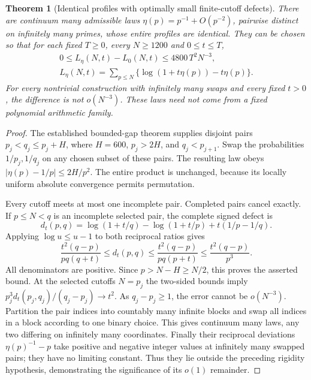 \documentclass[11pt]{article}
\newtheorem{theorem}{Theorem}[section]
\theoremstyle{definition}
\begin{document}
\begin{theorem}[Identical profiles with optimally small finite-cutoff defects]
There are continuum many admissible laws
$\eta(p)=p^{-1}+O(p^{-2})$, pairwise distinct on infinitely many primes,
whose entire profiles are identical. They can be chosen so that for
each fixed $T\ge0$, every $N\ge1200$ and $0\le t\le T$,
\[
 \begin{gathered}
 0\le L_\eta(N,t)-L_0(N,t)\le4800\,T^2N^{-3},\\
 L_\eta(N,t)=\sum_{p\le N}
       \{\log(1+t\eta(p))-t\eta(p)\}.
 \end{gathered}
\]
For every nontrivial construction with infinitely many swaps and every
fixed $t>0$, the difference is not $o(N^{-3})$.
These laws need not come from a fixed polynomial arithmetic family.
\end{theorem}
\begin{proof}
The established bounded-gap theorem supplies disjoint pairs
$p_j<q_j\le p_j+H$, where $H=600$, $p_j>2H$,
and $q_j<p_{j+1}$. Swap the probabilities $1/p_j,1/q_j$
on any chosen subset of these pairs. The resulting law obeys
$|\eta(p)-1/p|\le2H/p^2$.
The entire product is unchanged, because its locally uniform absolute
convergence permits permutation.

Every cutoff meets at most one incomplete pair.
Completed pairs cancel exactly. If $p\le N<q$ is an incomplete
selected pair, the complete signed defect is
\[
 d_t(p,q)=\log(1+t/q)-\log(1+t/p)+t(1/p-1/q).
\]
Applying $\log u\le u-1$ to both reciprocal ratios gives
\[
 \frac{t^2(q-p)}{pq(q+t)}
       \le d_t(p,q)\le
 \frac{t^2(q-p)}{pq(p+t)}
       \le \frac{t^2(q-p)}{p^3}.
\]
All denominators are positive. Since $p>N-H\ge N/2$, this proves
the asserted bound. At the selected cutoffs $N=p_j$ the two-sided
bounds imply
$p_j^3d_t(p_j,q_j)/(q_j-p_j)\to t^2$.
As $q_j-p_j\ge1$, the error cannot be $o(N^{-3})$.
Partition the pair indices into countably many infinite blocks and swap
all indices in a block according to one binary choice. This gives
continuum many laws, any two differing on infinitely many coordinates.
Finally their reciprocal deviations $\eta(p)^{-1}-p$ take positive
and negative integer values at infinitely many swapped pairs; they have
no limiting constant. Thus they lie outside the preceding rigidity
hypothesis, demonstrating the significance of its $o(1)$ remainder.
\end{proof}
\end{document}
